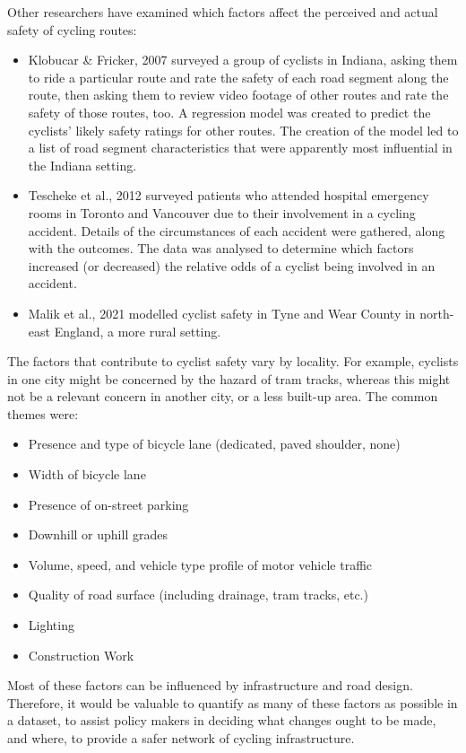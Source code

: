 \documentclass{article}
\begin{document}
Other researchers have examined which factors affect the perceived and actual safety of cycling routes:
\begin{itemize}
\item{Klobucar \& Fricker, 2007 \cite{BIKESAFETY} surveyed a group of cyclists in Indiana, asking them to ride a particular route and rate the safety of each road segment along the route, then asking them to review video footage of other routes and rate the safety of those routes, too.  A regression model was created to predict the cyclists' likely safety ratings for other routes.  The creation of the model led to a list of road segment characteristics that were apparently most influential in the Indiana setting.}
\item{Tescheke et al., 2012 \cite{Teschke2012} surveyed patients who attended hospital emergency rooms in Toronto and Vancouver due to their involvement in a cycling accident.  Details of the circumstances of each accident were gathered, along with the outcomes.  The data was analysed to determine which factors increased (or decreased) the relative odds of a cyclist being involved in an accident.}
\item{Malik et al., 2021 \cite{Malik2021} modelled cyclist safety in Tyne and Wear County in north-east England, a more rural setting.}
\end{itemize}
The factors that contribute to cyclist safety vary by locality.  For example, cyclists in one city might be concerned by the hazard of tram tracks, whereas this might not be a relevant concern in another city, or a less built-up area.  The common themes were:
\begin{itemize}
\item{Presence and type of bicycle lane (dedicated, paved shoulder, none)}
\item{Width of bicycle lane}
\item{Presence of on-street parking}
\item{Downhill or uphill grades}
\item{Volume, speed, and vehicle type profile of motor vehicle traffic}
\item{Quality of road surface (including drainage, tram tracks, etc.)}
\item{Lighting}
\item{Construction Work}
\end{itemize}
Most of these factors can be influenced by infrastructure and road design.  Therefore, it would be valuable to quantify as many of these factors as possible in a dataset, to assist policy makers in deciding what changes ought to be made, and where, to provide a safer network of cycling infrastructure.
\\
\end{document}
